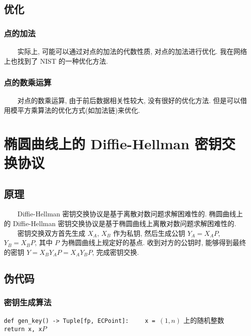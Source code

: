 \documentclass[12pt,a4paper]{article}
\begin{document}
\subsection*{优化}

\subsubsection*{点的加法}

　　实际上, 可能可以通过对点的加法的代数性质, 对点的加法进行优化. 我在网络上也找到了 NIST 的一种优化方法. 

\subsubsection*{点的数乘运算}

　　对点的数乘运算, 由于前后数据相关性较大, 没有很好的优化方法. 但是可以借用模平方乘算法的优化方式(如加法链)来优化. 

\section*{椭圆曲线上的 Diffie-Hellman 密钥交换协议}

\subsection*{原理}

　　Diffie-Hellman 密钥交换协议是基于离散对数问题求解困难性的. 椭圆曲线上的 Diffie-Hellman 密钥交换协议是基于椭圆曲线上离散对数问题求解困难性的.
\newline
　　密钥交换双方首先生成 $ X_A $, $ X_B $ 作为私钥, 然后生成公钥 $ Y_A = X_A P $, $ Y_B = X_B P $, 其中 $ P $ 为椭圆曲线上规定好的基点. 收到对方的公钥时, 能够得到最终的密钥 $ Y = X_B Y_A P = X_A Y_B P $, 完成密钥交换. 

\subsection*{伪代码}

\subsubsection*{密钥生成算法}

\lstinline{def gen_key() -> Tuple[fp, ECPoint]:}
\newline
\lstinline{    x = }$ (1, n) $ 上的随机整数
\newline
\lstinline{    return x, x}$ P $
\end{document}
